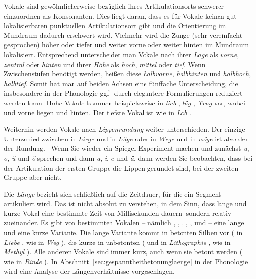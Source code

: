 Vokale sind gewöhnlicherweise bezüglich ihres Artikulationsorts schwerer einzuordnen als Konsonanten.
Dies liegt daran, dass es für Vokale keinen gut lokalisierbaren punktuellen Artikulationsort gibt und die Orientierung im Mundraum dadurch erschwert wird.
Vielmehr wird die Zunge (sehr vereinfacht gesprochen) höher oder tiefer und weiter vorne oder weiter hinten im Mundraum lokalisiert.
Entsprechend unterscheidet man Vokale nach ihrer \textit{Lage} als \textit{vorne}, \textit{zentral} oder \textit{hinten} und ihrer \textit{Höhe} als \textit{hoch}, \textit{mittel} oder \textit{tief}.
Wenn Zwischenstufen benötigt werden, heißen diese \textit{halbvorne}, \textit{halbhinten} und \textit{halbhoch}, \textit{halbtief}.
Somit hat man auf beiden Achsen eine fünffache Unterscheidung, die insbesondere in der Phonologie ggf.\ durch elegantere Formulierungen reduziert werden kann.
Hohe Vokale kommen beispielsweise in \textit{lieb} \textipa{[li:p]}, \textit{lüg} \textipa{[ly:k]}, \textit{Trug} \textipa{[tKu:k]} vor, wobei \textipa{[i]} und \textipa{[y]} vorne liegen und \textipa{[u]} hinten.
Der tiefste Vokal ist \textipa{[a]} wie in \textit{Lab} \textipa{[la:p]}.

Weiterhin werden Vokale nach \textit{Lippenrundung} weiter unterschieden.
Der einzige Unterschied zwischen \textipa{[i]} in \textit{Liege} \textipa{[li:g@]} und \textipa{[y]} in \textit{Lüge} \textipa{[ly:g@]} oder \textipa{[e]} in \textit{Wege} \textipa{[ve:g@]} und \textipa{[\o]} in \textit{wöge} \textipa{[v\o:g@]} ist also der der Rundung.
\TuBegin~Wenn Sie wieder ein Spiegel-Experiment machen und zunächst \textit{u}, \textit{o}, \textit{ü} und \textit{ö} sprechen und dann \textit{a}, \textit{i}, \textit{e} und \textit{ä}, dann werden Sie beobachten, dass bei der Artikulation der ersten Gruppe die Lippen gerundet sind, bei der zweiten Gruppe aber nicht.

Die \textit{Länge} bezieht sich schließlich auf die Zeitdauer, für die ein Segment artikuliert wird.
Das ist nicht absolut zu verstehen, in dem Sinn, dass lange und kurze Vokal eine bestimmte Zeit von Millisekunden dauern, sondern relativ zueinander.
Es gibt von bestimmten Vokalen -- nämlich \textipa{[i]}, \textipa{[y]}, \textipa{[u]}, \textipa{[e]}, \textipa{[\o]}, \textipa{[o]} und \textipa{[a]} -- eine lange und eine kurze Variante.
Die lange Variante kommt in betonten Silben vor (\textipa{[i:]} in \textit{Liebe} \textipa{[li:b@]}, \textipa{[e:]} wie in \textit{Weg} \textipa{[ve:k]}), die kurze in unbetonten (\textipa{[i]} und \textipa{[o]} in \textit{Lithographie} \textipa{[litogKafi:]}, \textipa{[e]} wie in \textit{Methyl} \textipa{[mety:l]}).
Alle anderen Vokale sind immer kurz, auch wenn sie betont werden (\textipa{[I]} wie in \textit{Rinde} \textipa{[KInd@]}).
In Abschnitt~\ref{sec:gespanntheitbetonunglaenge} in der Phonologie wird eine Analyse der Längenverhältnisse vorgeschlagen.

